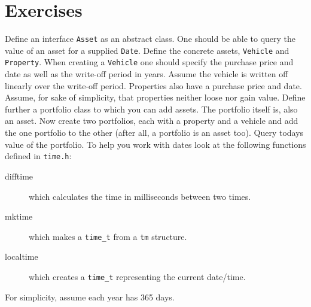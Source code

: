 \section{Exercises}

\begin{exercises}
  \item Define an interface \verb+Asset+ as an abstract class.
        One should be able to query the value of an asset for
        a supplied \verb+Date+. Define the concrete assets,
        \verb+Vehicle+ and \verb+Property+. When creating a 
        \verb+Vehicle+ one should specify the purchase price
        and date as well as the write-off period in years.
        Assume the vehicle is written off linearly over the 
        write-off period. Properties also have a purchase 
        price and date. Assume, for sake of simplicity, that
        properties neither loose nor gain value. Define 
        further a portfolio class to which you can add assets.
        The portfolio itself is, also an asset. Now create two 
        portfolios, each with a property and a vehicle and add
        the one portfolio to the other (after all, a portfolio
        is an asset too). Query todays value of the portfolio.
        To help you work with dates look at the following 
        functions defined in \verb+time.h+:
        \begin{description}
          \item[difftime] which calculates the time in milliseconds
                          between two times.
          \item[mktime] which makes a \verb+time_t+ from a \verb+tm+
                        structure.
          \item[localtime] which creates a \verb+time_t+ representing 
                           the current date/time.
        \end{description}
        For simplicity, assume each year has 365 days.
\end{exercises}
